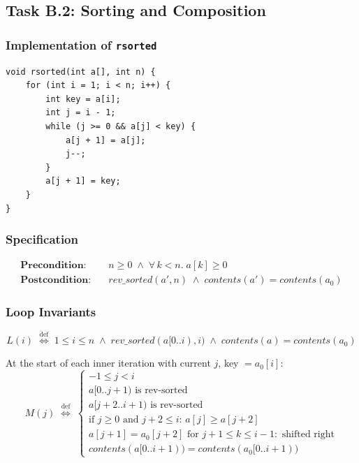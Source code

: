 \subsection{Task B.2: Sorting and Composition}

\subsubsection{Implementation of \texttt{rsorted}}

\begin{lstlisting}[style=cstyle, caption={Reverse insertion sort}]
void rsorted(int a[], int n) {
    for (int i = 1; i < n; i++) {
        int key = a[i];
        int j = i - 1;
        while (j >= 0 && a[j] < key) {
            a[j + 1] = a[j];
            j--;
        }
        a[j + 1] = key;
    }
}
\end{lstlisting}

\subsubsection{Specification}

\begin{align*}
  \textbf{Precondition:}\quad & n \geq 0 \;\wedge\; \forall\, k < n.\; a[k] \geq 0 \\
  \textbf{Postcondition:}\quad & \mathit{rev\_sorted}(a', n) \;\wedge\;
    \mathit{contents}(a') = \mathit{contents}(a_0)
\end{align*}

\subsubsection{Loop Invariants}

\begin{invariant}\label{inv:rsort-outer}
\[
  L(i) \;\stackrel{\text{def}}{\iff}\;
  1 \leq i \leq n \;\wedge\;
  \mathit{rev\_sorted}(a[0..i), i) \;\wedge\;
  \mathit{contents}(a) = \mathit{contents}(a_0)
\]
\end{invariant}

\begin{invariant}\label{inv:rsort-inner}
At the start of each inner iteration with current $j$, key $= a_0[i]$:
\[
  M(j) \;\stackrel{\text{def}}{\iff}\;
  \begin{cases}
    -1 \leq j < i \\
    a[0..j{+}1) \text{ is rev-sorted} \\
    a[j{+}2..i{+}1) \text{ is rev-sorted} \\
    \text{if } j \geq 0 \text{ and } j{+}2 \leq i\text{: } a[j] \geq a[j{+}2] \\
    a[j{+}1] = a_0[j{+}2] \text{ for } j{+}1 \leq k \leq i{-}1: \text{ shifted right} \\
    \mathit{contents}(a[0..i{+}1)) = \mathit{contents}(a_0[0..i{+}1))
  \end{cases}
\]
\end{invariant}


